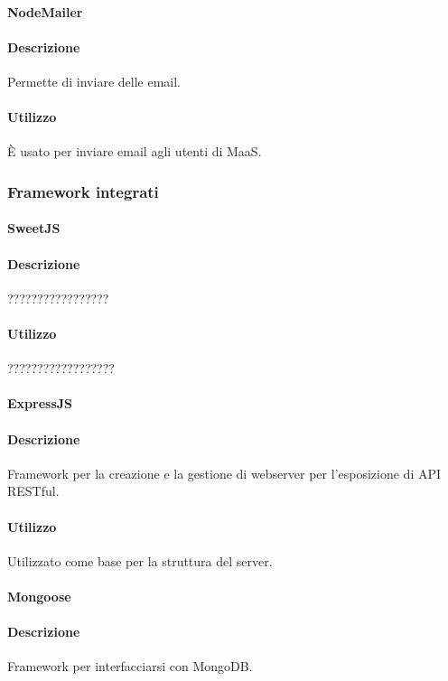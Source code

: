 \paragraph{NodeMailer}
\paragraph*{Descrizione}
Permette di inviare delle email.

\paragraph*{Utilizzo}
È usato per inviare email agli utenti di MaaS.

\subsubsection{Framework integrati}
\paragraph{SweetJS}
\paragraph*{Descrizione}
?????????????????

\paragraph*{Utilizzo}
??????????????????

\paragraph{ExpressJS}
\paragraph*{Descrizione}
Framework per la creazione e la gestione di webserver per l'esposizione di API RESTful.

\paragraph*{Utilizzo}
Utilizzato come base per la struttura del server.

\paragraph{Mongoose}
\paragraph*{Descrizione}
Framework per interfacciarsi con MongoDB.

